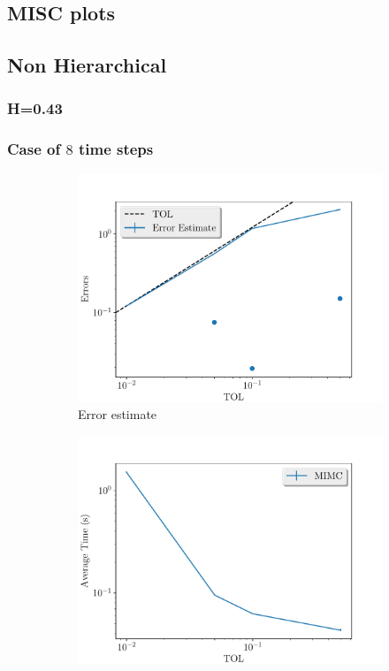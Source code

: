 \documentclass[11pt]{article}
\begin{document}
\newpage
\subsection{MISC plots}\label{sec:MISC plots}
\subsection{Non Hierarchical}

\subsubsection*{H=0.43}
\newpage
\subsubsection*{Case of $8$ time steps}
\begin{figure}[!h]
	\centering
	\begin{subfigure}{.4\textwidth}
		\centering
		\includegraphics[width=1\linewidth]{./figures/bergomi_misc/non_hierarchical/H_043/N_8/error_estimate.pdf}
		\caption{Error estimate}
		\label{fig:misc_rbergomi_8_steps_sub1}
	\end{subfigure}%
	\begin{subfigure}{.4\textwidth}
		\centering
		\includegraphics[width=1\linewidth]{./figures/bergomi_misc/non_hierarchical/H_043/N_8/average_running_time.pdf}

\end{subfigure}
\end{figure}
\end{document}
